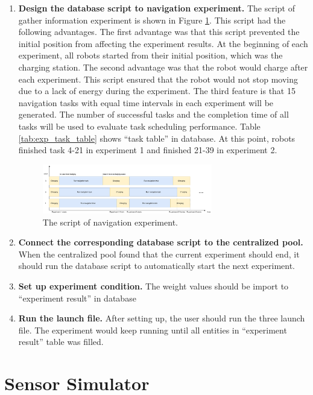 \begin{enumerate}
 \item \textbf{Design the database script to navigation experiment.} The script of gather information experiment is shown in Figure \ref{fig:nav_exp_timeline}.
 This script had the following advantages. The first advantage was that this script prevented the initial position from affecting the experiment results. At the beginning of each experiment, all robots started from their initial position, which was the charging station. The second advantage was that the robot would charge after each experiment. This script ensured that the robot would not stop moving due to a lack of energy during the experiment. The third feature is that 15 navigation tasks with equal time intervals in each experiment will be generated. The number of successful tasks and the completion time of all tasks will be used to evaluate task scheduling performance.
 Table \ref{tab:exp_task_table} shows ``task table'' in database. At this point, robots finished task 4-21 in experiment 1 and finished 21-39 in experiment 2. 
 \begin{figure}[htbp]
 \centering
 \includegraphics[width = 0.7\textwidth]{content/images/ch5/exe_exp_timeline.drawio.png}
 \caption{The script of navigation experiment.}
 \label{fig:nav_exp_timeline}
 \end{figure}
\item \textbf{Connect the corresponding database script to the centralized pool.} When the centralized pool found that the current experiment should end, it should run the database script to automatically start the next experiment.
\item \textbf{Set up experiment condition.} The weight values should be import to ``experiment result'' in database
\item \textbf{Run the launch file.} After setting up, the user should run the three launch file. The experiment would keep running until all entities in ``experiment result'' table was filled.


\end{enumerate}




\section{Sensor Simulator}
\label{sec:sensor_simulatior}

